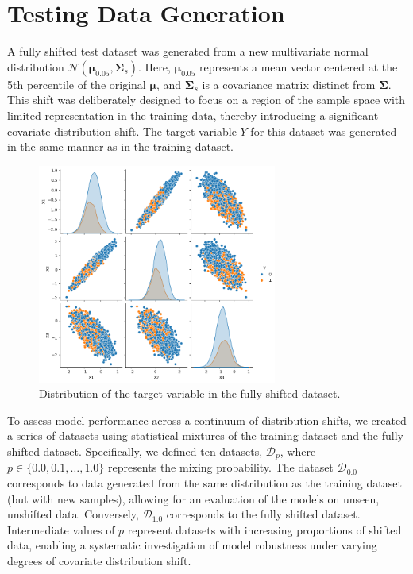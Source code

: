 \section{Testing Data Generation}
A fully shifted test dataset was generated from a new multivariate normal distribution $\mathcal{N}(\boldsymbol{\mu}_{0.05}, \boldsymbol{\Sigma}_s)$. Here, $\boldsymbol{\mu}_{0.05}$ represents a mean vector centered at the 5th percentile of the original $\boldsymbol{\mu}$, and $\boldsymbol{\Sigma}_s$ is a covariance matrix distinct from $\boldsymbol{\Sigma}$. This shift was deliberately designed to focus on a region of the sample space with limited representation in the training data, thereby introducing a significant covariate distribution shift. The target variable $Y$ for this dataset was generated in the same manner as in the training dataset.

\begin{figure}
    \centering
    \includegraphics[width=0.7\textwidth]{assets/label_dist_fullyshift.png}
    \caption{Distribution of the target variable in the fully shifted dataset.}
    \label{fig:label_dist_fullyshift}
\end{figure}

To assess model performance across a continuum of distribution shifts, we created a series of datasets using statistical mixtures of the training dataset and the fully shifted dataset. Specifically, we defined ten datasets, $\mathcal{D}_p$, where $p \in \{0.0, 0.1, \ldots, 1.0\}$ represents the mixing probability. The dataset $\mathcal{D}_{0.0}$ corresponds to data generated from the same distribution as the training dataset (but with new samples), allowing for an evaluation of the models on unseen, unshifted data. Conversely, $\mathcal{D}_{1.0}$ corresponds to the fully shifted dataset. Intermediate values of $p$ represent datasets with increasing proportions of shifted data, enabling a systematic investigation of model robustness under varying degrees of covariate distribution shift.

